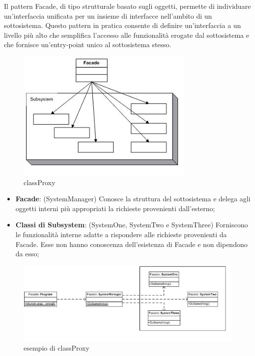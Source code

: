 \documentclass[a4paper,10pt]{article}
\begin{document}
        Il pattern Facade, di tipo strutturale basato sugli oggetti, permette di individuare un’interfaccia unificata per un insieme di interfacce nell’ambito di un sottosistema. Questo pattern in pratica consente di definire un’interfaccia a un livello più alto che semplifica l’accesso alle funzionalità erogate dal sottosistema e che fornisce un’entry-point unico al sottosistema stesso.
        \begin{figure}[h!] %
            \centering
            \includegraphics[scale=1]{img/IC94830}	
            \caption{classProxy}
        \end{figure}
    
        \begin{itemize}
            \item \textbf{Facade}: (SystemManager) Conosce la struttura del sottosistema e delega agli oggetti interni più appropriati la richieste provenienti dall’esterno;
            \item \textbf{Classi di Subsystem}: (SystemOne, SystemTwo e SystemThree) Forniscono le funzionalità interne adatte a rispondere alle richieste provenienti da Facade. Esse non hanno conoscenza dell’esistenza di Facade e non dipendono da esso;
        \end{itemize}
        
        \begin{figure}[h!] %
            \centering
            \includegraphics[scale=0.90]{img/IC101699}	
            \caption{esempio di classProxy}
        \end{figure}
\end{document}
